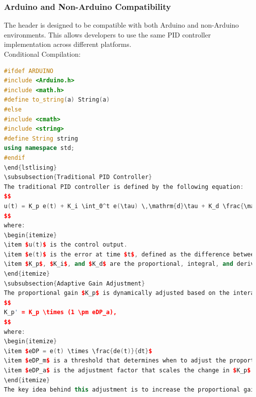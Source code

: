 \documentclass[a4paper,12pt]{article}
\begin{document}
\subsubsection{Arduino and Non-Arduino Compatibility}
The header is designed to be compatible with both Arduino and non-Arduino environments. This allows developers to use the same PID controller implementation across different platforms.\\
Conditional Compilation:
\begin{lstlisting}[language=C++]
#ifdef ARDUINO
#include <Arduino.h>
#include <math.h>
#define to_string(a) String(a)
#else
#include <cmath>
#include <string>
#define String string
using namespace std;
#endif
\end{lstlising}
\subsubsection{Traditional PID Controller}
The traditional PID controller is defined by the following equation:
$$
u(t) = K_p e(t) + K_i \int_0^t e(\tau) \,\mathrm{d}\tau + K_d \frac{\mathrm{d}e(t)}{\mathrm{d}t},
$$
where:
\begin{itemize}
\item $u(t)$ is the control output.
\item $e(t)$ is the error at time $t$, defined as the difference between the desired value and the measured value.
\item $K_p$, $K_i$, and $K_d$ are the proportional, integral, and derivative gains, respectively.
\end{itemize}
\subsubsection{Adaptive Gain Adjustment}
The proportional gain $K_p$ is dynamically adjusted based on the interaction between the current error $e(t)$ and its rate of change (derivative). This adjustment is designed to improve the responsiveness of the controller to changing conditions. The adaptation can be mathematically expressed as follows:
$$
K_p' = K_p \times (1 \pm eDP_a),
$$
where:
\begin{itemize}
\item $eDP = e(t) \times \frac{de(t)}{dt}$
\item $eDP_m$ is a threshold that determines when to adjust the proportional gain.
\item $eDP_a$ is the adjustment factor that scales the change in $K_p$ based on the error’s derivative. 
\end{itemize}
The key idea behind this adjustment is to increase the proportional gain when the system is experiencing a large error combined with a significant rate of change, which could indicate an approaching overshoot or oscillation. Conversely, if the error is decreasing but remains large, it may reduce the proportional gain to prevent excessive correction, allowing the system to stabilize more smoothly.

\end{lstlisting}
\end{document}
